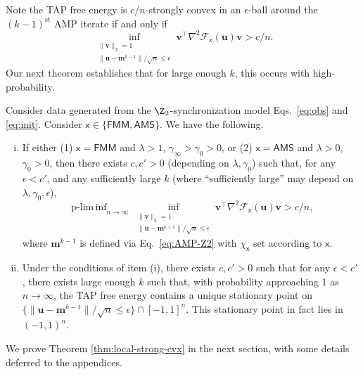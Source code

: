 \documentclass[]{article}
\def\sx{{\mathsf x}}
\def\cF{{\mathcal F}}
\def\bv{{\boldsymbol V}}
\def\bu{{\boldsymbol u}}
\def\bv{{\boldsymbol v}}
\def\cF{{\mathcal F}}
\def\bv{{\boldsymbol v}}
\def\bu{{\boldsymbol u}}
\def\bbm{{\boldsymbol m}}
\DeclareMathOperator*{\pliminf}{p-lim\,inf}
\def\FMM{\mathsf{FMM}}
\def\AMS{\mathsf{AMS}}
\begin{document}
Note the TAP free energy is $c/n$-strongly convex in an $\epsilon$-ball around the $(k-1)^\text{st}$ AMP iterate if and only if
\begin{equation}
    \inf_{ \substack{\| \bv \|_2 = 1 \\ \| \bu - \bbm^{k-1} \|/\sqrt{n} \leq \epsilon } }
    \bv^\top \nabla^2 \cF_{\sx} (\bu) \bv
    > c/n.
\end{equation}
Our next theorem establishes that for large enough $k$, this occurs with high-probability.
\begin{theorem}
\label{thm:local-strong-cvx}
    Consider data generated from the $\Z_2$-synchronization model Eqs.~\eqref{eq:obs} and \eqref{eq:init}.
    Consider $\sx \in \{\FMM,\AMS\}$.
    We have the following.
    \begin{enumerate}[(i)]

        \item %
        If either (1) $\sx = \FMM$ and $\lambda > 1$, $\gamma_\infty > \gamma_0 > 0$, or (2) $\sx = \AMS$ and $\lambda > 0$, $\gamma_0 > 0$,
        then
        there exists $c,c' > 0$ (depending on $\lambda,\gamma_0$) such that,
        for any $\epsilon < c'$,
        and any sufficiently large $k$ (where ``sufficiently large'' may depend on $\lambda,\gamma_0,\epsilon$),
        \begin{equation}
        \label{eq:local-cvx-hp}
            \pliminf_{n \rightarrow \infty} 
            \inf_{ \substack{\| \bv \|_2 = 1 \\ \| \bu - \bbm^{k-1} \|/\sqrt{n} \leq \epsilon } }
                \bv^\top \nabla^2 \cF_{\sx} (\bu) \bv
                > c/n, 
        \end{equation}
        where $\bbm^{k-1} $ is defined via Eq.~\eqref{eq:AMP-Z2} with $\chi_{\sx}$ set according to $\sx$.

        \item 
        Under the conditions of item (i),
        there exists $c,c' > 0$ such that for any $\epsilon < c'$, there exists large enough $k$ such that, with probability approaching $1$ as $n \rightarrow \infty$,
        the TAP free energy contains a unique stationary point on $\{ \| \bu - \bbm^{k-1} \|/\sqrt{n} \leq \epsilon \} \cap [-1,1]^n$.
        This stationary point in fact lies in $(-1,1)^n$.
    \end{enumerate}

\end{theorem}
\noindent We prove Theorem \ref{thm:local-strong-cvx} in the next section, with some details deferred to the appendices.
\end{document}
